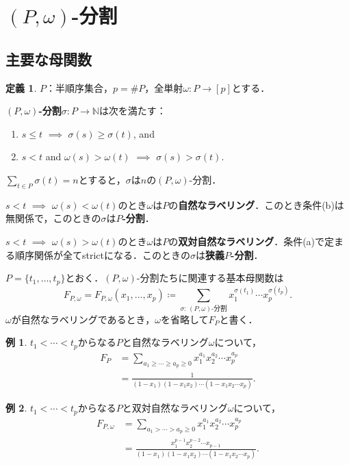 \documentclass[xelatex,ja=standard,a4paper,14pt,everyparhook=compat]{bxjsarticle}
\newcommand{\bbN}{\mathbb{N}}
\theoremstyle{definition}
\newtheorem*{example}{例}
\newtheorem*{definition}{定義}
\begin{document}
\section{$(P,\omega)$-分割}
\subsection{主要な母関数}

\begin{definition}
    $P$：半順序集合，$p = \#P$，全単射$\omega : P \to [p]$とする．

    \textbf{$(P,\omega)$-分割}$\sigma : P \to \bbN$は次を満たす： \begin{enumerate}
        \item $s \leq t$ $\implies$ $\sigma(s) \geq \sigma(t)$, and
        \item $s < t$ and $\omega(s) > \omega(t)$ $\implies$ $\sigma(s) > \sigma(t)$.
    \end{enumerate}
    $\sum_{t \in P} \sigma(t) = n$とすると，$\sigma$は$n$の$(P,\omega)$-分割．
\end{definition}

$s < t$ $\implies$ $\omega(s) < \omega(t)$のとき$\omega$は$P$の\textbf{自然なラベリング}．このとき条件(b)は無関係で，このときの$\sigma$は\textbf{$P$-分割}．

$s < t$ $\implies$ $\omega(s) > \omega(t)$のとき$\omega$は$P$の\textbf{双対自然なラベリング}．条件(a)で定まる順序関係が全てstrictになる．このときの$\sigma$は\textbf{狭義$P$-分割}．

$P = \{t_1,\ldots,t_p\}$とおく．$(P,\omega)$-分割たちに関連する基本母関数は \begin{equation*}
    F_{P,\omega} = F_{P,\omega}(x_1,\ldots,x_p) \coloneqq \sum_{\text{$\sigma$: $(P,\omega)$-分割}} x_1^{\sigma(t_1)} \cdots x_p^{\sigma(t_p)}.
\end{equation*}
$\omega$が自然なラベリングであるとき，$\omega$を省略して$F_P$と書く．

\begin{example}
    $t_1 < \cdots < t_p$からなる$P$と自然なラベリング$\omega$について， \begin{align*}
        F_P & = \sum_{a_1 \geq \cdots \geq a_p \geq 0} x_1^{a_1} x_2^{a_2} \cdots x_p^{a_p} \\
            & = \frac{1}{(1-x_1)(1-x_1x_2)\cdots(1-x_1x_2\cdots x_p)}.
    \end{align*}
\end{example}

\begin{example}
    $t_1 < \cdots < t_p$からなる$P$と双対自然なラベリング$\omega$について， \begin{align*}
        F_{P,\omega} & = \sum_{a_1 > \cdots > a_p \geq 0} x_1^{a_1} x_2^{a_2}\cdots x_p^{a_p}                  \\
                     & = \frac{x_1^{p-1}x_2^{p-2}\cdots x_{p-1}}{(1-x_1)(1-x_1x_2)\cdots(1-x_1x_2\cdots x_p)}.
    \end{align*}
\end{example}
\end{document}
